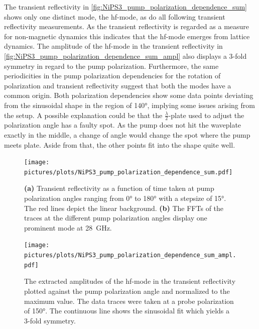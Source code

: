 The transient reflectivity in \autoref{fig:NiPS3_pump_polarization_dependence_sum} shows only one distinct mode, the hf-mode, as do all following transient reflectivity measurements.
As the transient reflectivity is regarded as a measure for non-magnetic dynamics this indicates that the hf-mode emerges from lattice dynamics.
The amplitude of the hf-mode in the transient reflectivity in \autoref{fig:NiPS3_pump_polarization_dependence_sum_ampl} also displays a 3-fold symmetry in regard to the pump polarization.
Furthermore, the same periodicities in the pump polarization dependencies for the rotation of polarization and transient reflectivity suggest that both the modes have a common origin.
Both polarization dependencies show some data points deviating from the sinusoidal shape in the region of 140°, implying some issues arising from the setup.
A possible explanation could be that the $\frac{\lambda}{2}$-plate used to adjust the polarization angle has a faulty spot.
As the pump does not hit the waveplate exactly in the middle, a change of angle would change the spot where the pump meets plate.
Aside from that, the other points fit into the shape quite well.
\begin{figure}[hbt!]
    \centering
    \texttt{[image: pictures/plots/NiPS3\_pump\_polarization\_dependence\_sum.pdf]} \vspace{-0.3cm}
    \caption{\textbf{(a)} Transient reflectivity as a function of time taken at pump polarization angles ranging from 0° to 180° with a stepsize of 15°. The red lines depict the linear background. \textbf{(b)} The FFTs of the traces at the different pump polarization angles display one prominent mode at \qty{28}{GHz}.}
    \label{fig:NiPS3_pump_polarization_dependence_sum}
\end{figure}
\begin{figure}[hbt!]
    \centering  
    \texttt{[image: pictures/plots/NiPS3\_pump\_polarization\_dependence\_sum\_ampl.pdf]} \vspace{-0.3cm}
    \caption{The extracted amplitudes of the hf-mode in the transient reflectivity plotted against the pump polarization angle and normalized to the maximum value. The data traces were taken at a probe polarization of 150°. The continuous line shows the sinusoidal fit which yields a 3-fold symmetry.}
    \label{fig:NiPS3_pump_polarization_dependence_sum_ampl}
\end{figure}
\FloatBarrier

\newpage
